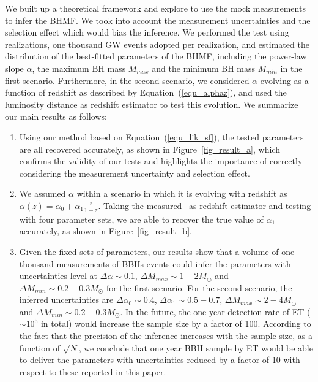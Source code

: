 \documentclass[twocolumn]{aastex62}
\begin{document}
We built up a theoretical framework and explore to use the mock measurements to infer the BHMF. We took into account the measurement uncertainties and the selection effect which would bias the inference. We performed the test using realizations, one thousand GW events adopted per realization, and estimated the distribution of the best-fitted parameters of the BHMF, including the power-law slope $\alpha$, the maximum BH mass $M_{max}$ and the minimum BH mass $M_{min}$ in the first scenario. Furthermore, in the second scenario, we considered  $\alpha$ evolving as a function of redshift as described by Equation~(\ref{equ_alphaz}), and used the luminosity distance as redshift estimator to test this evolution. We summarize our main results as follows:
\begin{enumerate}
\item Using our method based on Equation~(\ref{equ_lik_sf}), the tested parameters are all recovered accurately, as shown in Figure~\ref{fig_result_a}, which confirms the validity of our tests and highlights the importance of correctly considering the measurement uncertainty and selection effect.
\item We assumed $\alpha$ within a scenario in which it is evolving with redshift as $\alpha(z) = \alpha_0 + \alpha_1\frac{z}{1+z}$. Taking the measured \dl\ as redshift estimator and testing with four parameter sets, we are able to recover the true value of $\alpha_1$ accurately, as shown in Figure~\ref{fig_result_b}.
\item Given the fixed sets of parameters, our results show that a volume of one thousand measurements of BBHs events could infer the parameters with uncertainties level at $\Delta\alpha\sim0.1$, $\Delta M_{max}\sim1-2M_{\odot}$ and $\Delta M_{min}\sim0.2-0.3M_{\odot}$ for the first scenario. For the second scenario, the inferred uncertainties are $\Delta\alpha_0\sim0.4$, $\Delta\alpha_1\sim0.5-0.7$, $\Delta M_{max}\sim2-4M_{\odot}$ and $\Delta M_{min}\sim0.2-0.3M_{\odot}$. In the future, the one year detection rate of ET ($\sim10^5$ in total) would increase the sample size by a factor of 100. According to the fact that the precision of the inference increases with the sample size, as a function of $\sqrt{N}$, we conclude that one year BBH sample by ET would be able to deliver the parameters with uncertainties reduced by a factor of 10 with respect to these reported in this paper.
\end{enumerate}
\end{document}
